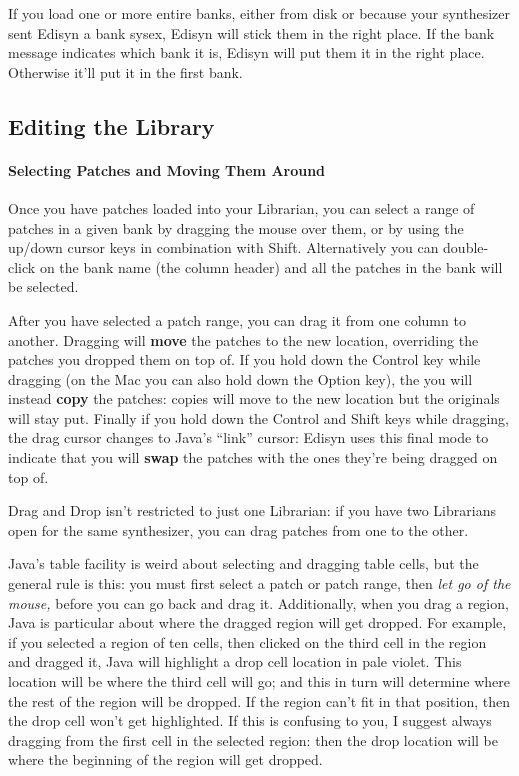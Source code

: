\documentclass{article}
\begin{document}
If you load one or more entire banks, either from disk or because your synthesizer sent Edisyn a bank sysex, Edisyn will stick them in the right place.  If the bank message indicates which bank it is, Edisyn will put them it in the right place.  Otherwise it'll put it in the first bank.



\subsection{Editing the Library} 

\paragraph{Selecting Patches and Moving Them Around}

Once you have patches loaded into your Librarian, you can select a range of patches in a given bank by dragging the mouse over them, or by using the up/down cursor keys in combination with Shift.  Alternatively you can double-click on the bank name (the column header) and all the patches in the bank will be selected.

After you have selected a patch range, you can drag it from one column to another.  Dragging will {\bf move} the patches to the new location, overriding the patches you dropped them on top of.  If you hold down the Control key while dragging (on the Mac you can also hold down the Option key), the you will instead {\bf copy} the patches: copies will move to the new location but the originals will stay put.  Finally if you hold down the Control and Shift keys while dragging, the drag cursor changes to Java's ``link'' cursor:   Edisyn uses this final mode to indicate that you will {\bf swap} the patches with the ones they're being dragged on top of.

Drag and Drop isn't restricted to just one Librarian: if you have two Librarians open for the same synthesizer, you can drag patches from one to the other. 

Java's table facility is weird about selecting and dragging table cells, but the general rule is this: you must first select a patch or patch range, then {\it let go of the mouse,} before you can go back and drag it. Additionally, when you drag a region, Java is particular about where the dragged region will get dropped.  For example, if you selected a region of ten cells, then clicked on the third cell in the region and dragged it, Java will highlight a drop cell location in pale violet.  This location will be where the third cell will go; and this in turn will determine where the rest of the region will be dropped.   If the region can't fit in that position, then the drop cell won't get highlighted.  If this is confusing to you, I suggest always dragging from the first cell in the selected region: then the drop location will be where the beginning of the region will get dropped.
\end{document}
